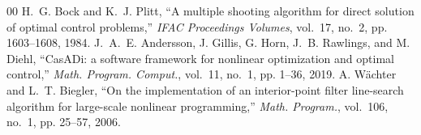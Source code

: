 \begin{thebibliography}{00}
 H.~G. Bock and K.~J. Plitt, ``A multiple shooting algorithm for direct solution of optimal control problems,'' \textit{IFAC Proceedings Volumes}, vol.~17, no.~2, pp. 1603--1608, 1984.
 J.~A.~E. Andersson, J. Gillis, G. Horn, J.~B. Rawlings, and M. Diehl, ``CasADi: a software framework for nonlinear optimization and optimal control,'' \textit{Math. Program. Comput.}, vol.~11, no.~1, pp. 1--36, 2019.
 A. W\"achter and L.~T. Biegler, ``On the implementation of an interior-point filter line-search algorithm for large-scale nonlinear programming,'' \textit{Math. Program.}, vol.~106, no.~1, pp. 25--57, 2006.
\end{thebibliography}